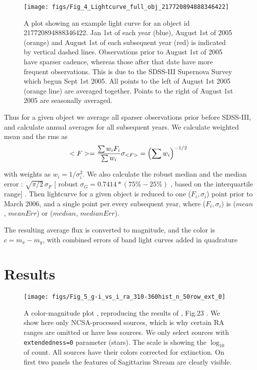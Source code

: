 \documentclass[fleqn,usenatbib]{mnras}  %
\begin{document}
\begin{figure}

 \texttt{[image: figs/Fig\_4\_Lightcurve\_full\_obj\_217720894888346422]}
 \cprotect\caption{A plot showing an example light curve for an object id 217720894888346422. Jan 1st of each year (blue),  August 1st of 2005 (orange) and August 1st of each subsequent year (red) is indicated by vertical dashed lines. Observations prior to August 1st of 2005 have sparser cadence, whereas those after that date have more frequent observations.  This is due to the SDSS-III Supernova Survey which begun  Sept 1st 2005.  All points to the left of August 1st 2005 (orange line) are averaged together.  Points to the right of August 1st 2005 are seasonally averaged. }
 \label{fig:lc_example}
\end{figure}

Thus for a given object we average all sparser observations prior before SDSS-III, and calculate annual averages for all subsequent years. We calculate weighted mean and the rms as 
\begin{equation}
<F> = \frac{\sum {w_{i}F_{i}}}{\sum{w_{i}}} \\
\sigma_{<F>} = \left( \sum{w_{i}}\right) ^{-1/2} 
\end{equation}

with weights as  $w_{i} = 1 / \sigma_{i}^{2}$. We also calculate the robust  median and the median error : $\sqrt{\pi / 2} \, \sigma_{F}$  [ robust $\sigma_{G} = 0.7414 * (75\% - 25\%) $ , based on the interquartile range] . Then lightcurve for a given object is reduced to one ($F_{i}, \sigma_{i}$) point prior to March 2006, and a single point per every subsequent year, where  ($F_{i}, \sigma_{i}$) is ($mean$, $meanErr$) or ($median$, $medianErr$).


The resulting average flux is converted to magnitude, and the color is  $c = m_{x}-m_{y}$, with combined errors of band light curves added in quadrature




\section{Results}
\label{sec:results}


\begin{figure*}

\texttt{[image: figs/Fig\_5\_g-i\_vs\_i\_ra\_310-360hist\_n\_50row\_ext\_0]}
\cprotect\caption{A color-magnitude plot , reproducing the results of \citep{sesar2010} , Fig.23 .  We show here only NCSA-processed sources, which is why certain RA ranges are omitted or have less sources. We only select sources with \verb|extendedness=0| parameter (stars).  The scale is showing the $\log_{10}$ of count. All sources have their  colors corrected for extinction. On first two panels the features of Sagittarius Stream are clearly visible. }
\label{fig:colors_example}
\end{figure*}
% 
\end{document}
